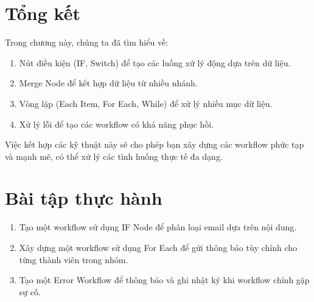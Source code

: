 \section{Tổng kết}

Trong chương này, chúng ta đã tìm hiểu về:

\begin{enumerate}
  \item Nút điều kiện (IF, Switch) để tạo các luồng xử lý động dựa trên dữ liệu.
  \item Merge Node để kết hợp dữ liệu từ nhiều nhánh.
  \item Vòng lặp (Each Item, For Each, While) để xử lý nhiều mục dữ liệu.
  \item Xử lý lỗi để tạo các workflow có khả năng phục hồi.
\end{enumerate}

Việc kết hợp các kỹ thuật này sẽ cho phép bạn xây dựng các workflow phức tạp và mạnh mẽ, có thể xử lý các tình huống thực tế đa dạng.

\newpage
\section{Bài tập thực hành}

\begin{enumerate}
  \item Tạo một workflow sử dụng IF Node để phân loại email dựa trên nội dung.
  \item Xây dựng một workflow sử dụng For Each để gửi thông báo tùy chỉnh cho từng thành viên trong nhóm.
  \item Tạo một Error Workflow để thông báo và ghi nhật ký khi workflow chính gặp sự cố.
\end{enumerate}